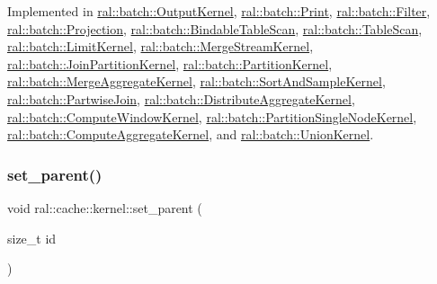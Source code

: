 Implemented in \hyperlink{classral_1_1batch_1_1OutputKernel_a53519f315635c5e83e958fda42300f9a}{ral\+::batch\+::\+Output\+Kernel}, \hyperlink{classral_1_1batch_1_1Print_aaa9c9b3999fa088344f8505fcf201721}{ral\+::batch\+::\+Print}, \hyperlink{classral_1_1batch_1_1Filter_acae535218dc139f0db24b80cb39353c2}{ral\+::batch\+::\+Filter}, \hyperlink{classral_1_1batch_1_1Projection_a14bafcd753d4bd86160bec679ac19058}{ral\+::batch\+::\+Projection}, \hyperlink{classral_1_1batch_1_1BindableTableScan_a3215b390c1b588e165724b108038cbf9}{ral\+::batch\+::\+Bindable\+Table\+Scan}, \hyperlink{classral_1_1batch_1_1TableScan_a0dd1b7ffeaec582922ee586b452245c0}{ral\+::batch\+::\+Table\+Scan}, \hyperlink{classral_1_1batch_1_1LimitKernel_a154ab2ef98ef7be11d3ba6c8dc6db06d}{ral\+::batch\+::\+Limit\+Kernel}, \hyperlink{classral_1_1batch_1_1MergeStreamKernel_a7d89339b2f4f3adecda2fe64b47948cd}{ral\+::batch\+::\+Merge\+Stream\+Kernel}, \hyperlink{classral_1_1batch_1_1JoinPartitionKernel_a7c96cd734ef57582b2bd8c2a7a86329e}{ral\+::batch\+::\+Join\+Partition\+Kernel}, \hyperlink{classral_1_1batch_1_1PartitionKernel_a5313617a63ab0fb23a0e4211399f439f}{ral\+::batch\+::\+Partition\+Kernel}, \hyperlink{classral_1_1batch_1_1MergeAggregateKernel_aaab8112819acc0c2f17fc0e518cfe266}{ral\+::batch\+::\+Merge\+Aggregate\+Kernel}, \hyperlink{classral_1_1batch_1_1SortAndSampleKernel_a6e97bc1286a0e8d8273556d56372fa56}{ral\+::batch\+::\+Sort\+And\+Sample\+Kernel}, \hyperlink{classral_1_1batch_1_1PartwiseJoin_a280aee308eff9e14f239cdce229c4035}{ral\+::batch\+::\+Partwise\+Join}, \hyperlink{classral_1_1batch_1_1DistributeAggregateKernel_a9508b135d44027058ce72ace2ffba98f}{ral\+::batch\+::\+Distribute\+Aggregate\+Kernel}, \hyperlink{classral_1_1batch_1_1ComputeWindowKernel_a22a36fbcb21dad09bad9300e21dc4825}{ral\+::batch\+::\+Compute\+Window\+Kernel}, \hyperlink{classral_1_1batch_1_1PartitionSingleNodeKernel_a5af293b33505bec1e9fb66f9bb9d29af}{ral\+::batch\+::\+Partition\+Single\+Node\+Kernel}, \hyperlink{classral_1_1batch_1_1ComputeAggregateKernel_ad3f8e41cf0adf95dbe0249a6dd9c1240}{ral\+::batch\+::\+Compute\+Aggregate\+Kernel}, and \hyperlink{classral_1_1batch_1_1UnionKernel_a30f9875564a6057113b2fd7debfdf7a9}{ral\+::batch\+::\+Union\+Kernel}.

\mbox{\label{classral_1_1cache_1_1kernel_a150ae499b8aef4669714e791f2bea9e9}} 
\subsubsection{\texorpdfstring{set\+\_\+parent()}{set\_parent()}}
{\footnotesize\ttfamily void ral\+::cache\+::kernel\+::set\+\_\+parent (\begin{DoxyParamCaption}\item[{size\+\_\+t}]{id }\end{DoxyParamCaption})\hspace{0.3cm}{\ttfamily [inline]}}



